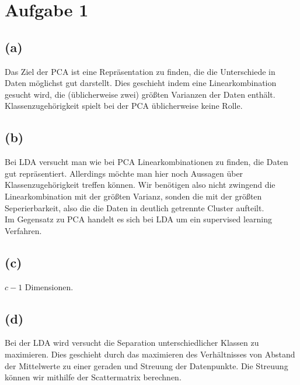 \documentclass[a4paper]{scrartcl}
\newcounter{punkte}
\begin{document}
\section*{Aufgabe 1}
\subsection*{(a)}
Das Ziel der PCA ist eine Repräsentation zu finden, die die Unterschiede in Daten möglichst gut darstellt. Dies geschieht indem eine Linearkombination gesucht wird, die (üblicherweise zwei) größten Varianzen der Daten enthält.\\
Klassenzugehörigkeit spielt bei der PCA üblicherweise keine Rolle. %



\subsection*{(b)}
Bei LDA versucht man wie bei PCA Linearkombinationen zu finden, die Daten gut repräsentiert. Allerdings möchte man hier noch Aussagen über Klassenzugehörigkeit treffen können. Wir benötigen also nicht zwingend die Linearkombination mit der größten Varianz, sonden die mit der größten Seperierbarkeit, also die die Daten in deutlich getrennte Cluster aufteilt.\\
Im Gegensatz zu PCA handelt es sich bei LDA um ein supervised learning Verfahren.



\subsection*{(c)}
$c-1$ Dimensionen.





\subsection*{(d)}
Bei der LDA wird versucht die Separation unterschiedlicher Klassen zu maximieren. Dies geschieht durch das maximieren des Verhältnisses von Abstand der Mittelwerte zu einer geraden und Streuung der Datenpunkte. Die Streuung können wir mithilfe der Scattermatrix berechnen.
\end{document}
